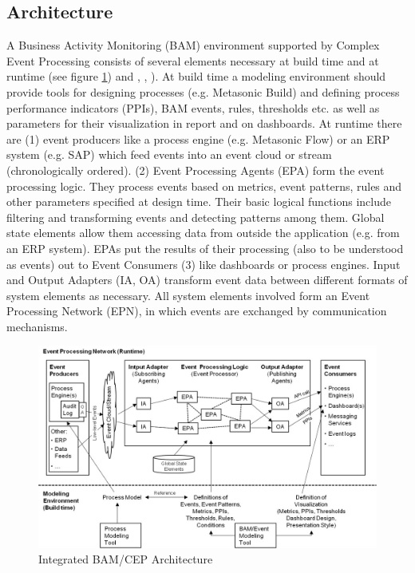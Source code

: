\subsection{Architecture }  
A Business Activity Monitoring (BAM) environment supported by Complex Event Processing consists of several elements necessary at build time and at runtime (see figure \ref{fig:BAMArchitecture}) and \cite{book:processmonitoring}, \cite{book:CEPinAction} , \cite{article:BlueprintEventBPM}). At build time a modeling environment should provide tools for designing processes (e.g. Metasonic Build) and defining process performance indicators (PPIs), BAM events, rules, thresholds etc. as well as parameters for their visualization in report and on dashboards. At runtime there are (1) event producers like a process engine (e.g. Metasonic Flow) or an ERP system (e.g. SAP) which feed events into an event cloud or stream (chronologically ordered). (2) Event Processing Agents (EPA) form the event processing logic. They process events based on metrics, event patterns, rules and other parameters specified at design time. Their basic logical functions include filtering and transforming events and detecting patterns among them. Global state elements allow them accessing data from outside the application (e.g. from an ERP system). EPAs put the results of their processing (also to be understood as events) out to Event Consumers (3) like dashboards or process engines. Input and Output Adapters (IA, OA) transform event data between different formats of system elements as necessary. All system elements involved form an Event Processing Network (EPN), in which events are exchanged by communication mechanisms.

\begin{figure}[htbp]
	\centering
	\includegraphics[width=0.9\linewidth]{Figures/Chapter5/Monitoring/Integrated-BAM-CEP-Architecture-27.jpg}
	\caption[Integrated BAM/CEP Architecture 27]{Integrated BAM/CEP Architecture \cite{book:processmonitoring}}
	\label{fig:BAMArchitecture}
\end{figure}



